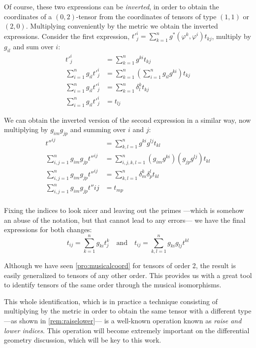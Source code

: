 \begin{remark}
	\label{rem:raiselower}
	Of course, these two expressions can be \emph{inverted}, in order to obtain the coordinates of a $(0,2)$-tensor from the coordinates of tensors of type $(1,1)$ or $(2,0)$. Multiplying conveniently by the metric we obtain the inverted expressions. Consider the first expression, $t'^i_j = \sum_{k=1}^n g^*(\varphi^k, \varphi^i) t_{kj}$, multiply by $g_{il}$ and sum over $i$:
	\begin{align*}
		t'^i_j &= \sum_{k=1}^n g^{ki} t_{kj} \\
		\sum_{i=1}^n g_{il} t'^i_j &= \sum_{k=1}^n \left(\sum_{i=1}^n g_{il} g^{ki}\right) t_{kj} \\
		\sum_{i=1}^n g_{il} t'^i_j &= \sum_{k=1}^n \delta^k_l t_{kj} \\
		\sum_{i=1}^n g_{il} t'^i_j &= t_{lj}
	\end{align*}
	
	We can obtain the inverted version of the second expression in a similar way, now multiplying by $g_{im} g_{jp}$ and summing over $i$ and $j$:
	\begin{align*}
		t''^{ij} &= \sum_{k,l = 1}^n g^{ki} g^{lj} t_{kl} \\
		\sum_{i,j=1}^n g_{im} g_{jp} t''^{ij} &= \sum_{i,j,k,l = 1}^n \left( g_{im} g^{ki} \right) \left( g_{jp} g^{lj} \right) t_{kl} \\
		\sum_{i,j=1}^n g_{im} g_{jp} t''^{ij} &= \sum_{k,l = 1}^n \delta_m^k \delta_p^l t_{kl} \\
		\sum_{i,j=1}^n g_{im} g_{jp} t''{ij} &= t_{mp} \\
	\end{align*}

	Fixing the indices to look nicer and leaving out the primes ---which is somehow an abuse of the notation, but that cannot lead to any errors--- we have the final expressions for both changes:
	\[
		t_{ij} = \sum_{k=1}^n g_{ki} t^k_j
		\quad \textrm{and} \quad
		t_{ij} = \sum_{k,l=1}^n g_{ki} g_{lj} t^{kl}
	\]
\end{remark}

Although we have seen \autoref{pro:musicalcoord} for tensors of order 2, the result is easily generalized to tensors of any other order. This provides us with a great tool to identify tensors of the same order through the musical isomorphisms.

This whole identification, which is in practice a technique consisting of multiplying by the metric in order to obtain the same tensor with a different type ---as shown in \autoref{rem:raiselower}--- is a well-known operation known as \emph{raise and lower indices}. This operation will become extremely important on the differential geometry discussion, which will be key to this work.

